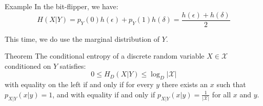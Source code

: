 \documentclass[a4paper]{article}
\begin{document}
\begin{parag}{Example}
    In the bit-flipper, we have:
    \[H\left(X|Y\right) = p_Y\left(0\right) h\left(\epsilon\right) + p_Y\left(1\right)h\left(\delta\right) = \frac{h\left(\epsilon\right) + h\left(\delta\right)}{2}\]

    This time, we do use the marginal distribution of $Y$.
\end{parag}

\begin{parag}{Theorem}
    The conditional entropy of a discrete random variable $X \in \mathcal{X}$ conditioned on $Y$ satisfies:
    \[0 \leq H_D\left(X|Y\right) \leq \log_D\left|\mathcal{X}\right|\]
    with equality on the left if and only if for every $y$ there exists an $x$ such that $p_{X|Y}\left(x|y\right) = 1$, and with equality if and only if $p_{X|Y}\left(x|y\right) = \frac{1}{\left|\mathcal{X}\right|}$ for all $x$ and $y$.
\end{parag}
\end{document}
